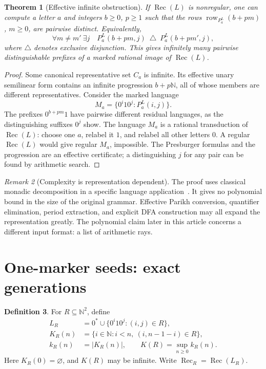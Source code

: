 \documentclass[11pt,letterpaper]{article}
\newtheorem{theorem}{Theorem}[section]
\theoremstyle{definition}
\newtheorem{definition}[theorem]{Definition}
\theoremstyle{remark}
\newtheorem{remark}[theorem]{Remark}
\newcommand{\N}{\mathbb N}
\newcommand{\rec}{\operatorname{Rec}}
\newcommand{\row}{\operatorname{row}}
\begin{document}
\begin{theorem}[Effective infinite obstruction]\label{ccc:cl:thm:obstruction}
If $\rec(L)$ is nonregular, one can compute a letter $a$ and integers
$b\ge0$, $p\ge1$ such that the rows
$\row_{P_a^L}(b+pm)$, $m\ge0$, are pairwise distinct. Equivalently,
\[
 \forall m\ne m'\ \exists j\quad
 P_a^L(b+pm,j)\ \mathbin{\triangle}\ P_a^L(b+pm',j),
\]
where $\triangle$ denotes exclusive disjunction. This gives infinitely
many pairwise distinguishable prefixes of a marked rational image of
$\rec(L)$.
\end{theorem}
\begin{proof}
Some canonical representative set $C_a$ is infinite. Its effective unary
semilinear form contains an infinite progression $b+p\N$, all of whose
members are different representatives. Consider the marked language
\[
 M_a=\{0^i1 0^j:P_a^L(i,j)\}.
\]
The prefixes $0^{b+pm}1$ have pairwise different residual languages, as the
distinguishing suffixes $0^j$ show. The language $M_a$ is a rational
transduction of $\rec(L)$: choose one $a$, relabel it $1$, and relabel all
other letters $0$. A regular $\rec(L)$ would give regular $M_a$, impossible.
The Presburger formulas and the progression are an effective certificate;
a distinguishing $j$ for any pair can be found by arithmetic search.
\end{proof}

\begin{remark}[Complexity is representation dependent]
The proof uses classical monadic decomposition in a specific language
application~\cite{Barcelo,Hague,Ganardi}. It gives no polynomial bound in
the size of the original grammar. Effective Parikh conversion, quantifier
elimination, period extraction, and explicit DFA construction may all
expand the representation greatly. The polynomial claim later in this
article concerns a different input format: a list of arithmetic rays.
\end{remark}

\section{One-marker seeds: exact generations}\label{ccc:cl:sec:marker}

\begin{definition}
For $R\subseteq\N^2$, define
\begin{align}
 L_R&=0^*\cup\{0^i1 0^j:(i,j)\in R\},\label{ccc:cl:eq:seed}\\
 K_R(n)&=\{i\in\N:i<n,\ (i,n-1-i)\in R\},\label{ccc:cl:eq:positions}\\
 k_R(n)&=|K_R(n)|,\qquad K(R)=\sup_{n\ge0}k_R(n).
\end{align}
Here $K_R(0)=\varnothing$, and $K(R)$ may be infinite.
Write $\rec_R=\rec(L_R)$.
\end{definition}
\end{document}
